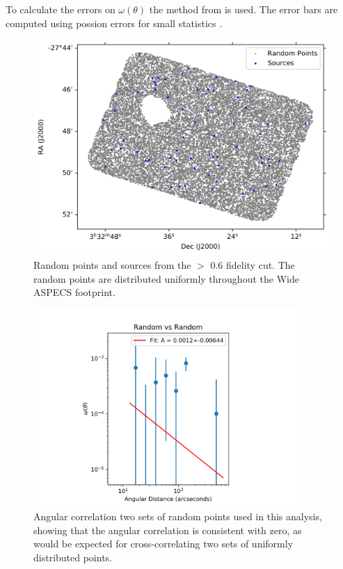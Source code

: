 To calculate the errors on $\omega(\theta)$ the method from \cite{1986ApJ...303..336G} is used. The error bars are computed using possion errors for small statistics \cite{1986ApJ...303..336G}.


\begin{figure}[tbp]
\centering \includegraphics[width=120mm]{PDFS/NX_V_Y_Sources_20000.png}
\caption{Random points and sources from the $>$ 0.6 fidelity cut. The random points are distributed uniformly throughout the Wide ASPECS footprint.}
\label{fig:Clustering_points}
\end{figure}

\begin{figure}[tbp]
\centering \includegraphics[width=100mm]{clustering/Log_Random_vs_Random_15000NoParenFlip_bin10.png}
\caption{Angular correlation two sets of random points used in this analysis, showing that the angular correlation is consistent with zero, as would be expected for cross-correlating two sets of uniformly distributed points.}
\label{fig:random_points}
\end{figure}


